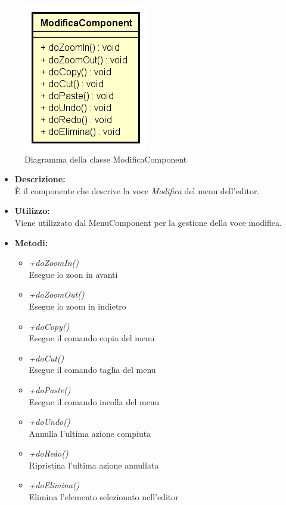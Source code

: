 \begin{figure}[h!]
	\centering
	\includegraphics[scale=0.8]{res/sections/SpecificaFrontEnd/Components/Disegnetti/modifica.png}
	\caption{Diagramma della classe ModificaComponent}
\end{figure}

\begin{itemize}
	\item \textbf{Descrizione:}\\
	È il componente che descrive la voce \textit{Modifica} del menu dell'editor.
	\item \textbf{Utilizzo:}\\
	Viene utilizzato dal MenuComponent per la gestione della voce modifica.
	\item \textbf{Metodi:}
		\begin{itemize}
			\item \emph{+doZoomIn()}\\
    		Esegue lo zoon in avanti
    		\item \emph{+doZoomOut()}\\
    		Esegue lo zoom in indietro
    		\item \emph{+doCopy()}\\
    		Esegue il comando copia del menu
    		\item \emph{+doCut()}\\
    		Esegue il comando taglia del menu
    		\item \emph{+doPaste()}\\
    		Esegue il comando incolla del menu
    		\item \emph{+doUndo()}\\
    		Annulla l'ultima azione compiuta
    		\item \emph{+doRedo()}\\
    		Ripristina l'ultima azione annullata
    		\item \emph{+doElimina()}\\
    		Elimina l'elemento selezionato nell'editor	    		
		\end{itemize}
\end{itemize}
